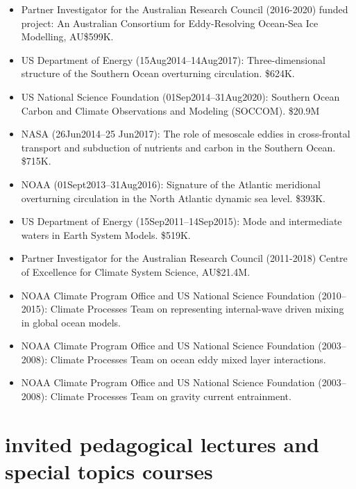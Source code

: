 \documentclass{article}
\begin{document}
\begin{itemize}[leftmargin=*]
\item Partner Investigator for the  Australian Research Council (2016-2020) funded project: An Australian Consortium for Eddy-Resolving Ocean-Sea Ice Modelling, AU\$599K.

\item US Department of Energy (15Aug2014--14Aug2017): Three-dimensional structure of the Southern Ocean overturning
circulation.  \$624K.

\item US National Science Foundation (01Sep2014--31Aug2020): Southern Ocean Carbon and Climate Observations and Modeling
(SOCCOM). \$20.9M

\item NASA (26Jun2014--25 Jun2017): The role of mesoscale eddies in cross-frontal transport and subduction of nutrients and carbon in
  the Southern Ocean.  \$715K.

\item NOAA (01Sept2013--31Aug2016): Signature of the Atlantic meridional overturning circulation in the North Atlantic dynamic sea
  level.  \$393K.

\item US Department of Energy (15Sep2011--14Sep2015): Mode and intermediate waters in Earth System Models. \$519K.

\item Partner Investigator for the Australian Research Council (2011-2018) Centre of Excellence for Climate System Science, AU\$21.4M.
  
\item NOAA Climate Program Office and US National Science Foundation (2010--2015): Climate Processes Team on representing internal-wave driven mixing in global ocean models.

\item NOAA Climate Program Office and US National Science Foundation (2003--2008): Climate Processes Team on ocean eddy mixed layer interactions.

\item NOAA Climate Program Office and US National Science Foundation (2003--2008): Climate Processes Team on gravity current entrainment.



\end{itemize}


\section*{\sc  \color{Maroon}  invited pedagogical lectures and special topics courses}
\vspace{-.3cm}
\end{document}
